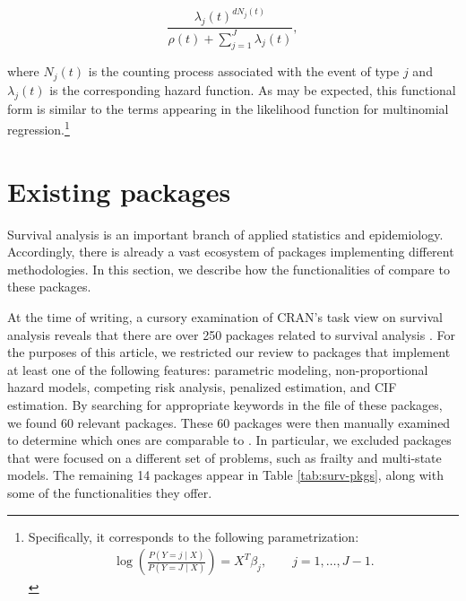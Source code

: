 \documentclass[
]{jss}
\begin{document}
\[\frac{\lambda_j(t)^{dN_j(t)}}{\rho(t) + \sum_{j=1}^J\lambda_j(t)},\]

where \(N_j(t)\) is the counting process associated with the event of
type \(j\) and \(\lambda_j(t)\) is the corresponding hazard function. As
may be expected, this functional form is similar to the terms appearing
in the likelihood function for multinomial
regression.\footnote{Specifically, it corresponds to the following parametrization: \begin{align*} \log\left(\frac{P(Y=j \mid X)}{P(Y = J \mid X)}\right) = X^T\beta_j, \qquad j = 1,\ldots, J-1.\end{align*}}

\hypertarget{existing-packages}{%
\section{Existing packages}\label{existing-packages}}

Survival analysis is an important branch of applied statistics and
epidemiology. Accordingly, there is already a vast ecosystem of 
packages implementing different methodologies. In this section, we
describe how the functionalities of  compare to these
packages.

At the time of writing, a cursory examination of CRAN's task view on
survival analysis reveals that there are over 250 packages related to
survival analysis \citeyearpar{survTaskView}. For the purposes of this
article, we restricted our review to packages that implement at least
one of the following features: parametric modeling, non-proportional
hazard models, competing risk analysis, penalized estimation, and CIF
estimation. By searching for appropriate keywords in the
 file of these packages, we found 60 relevant
packages. These 60 packages were then manually examined to determine
which ones are comparable to . In particular, we excluded
packages that were focused on a different set of problems, such as
frailty and multi-state models. The remaining 14 packages appear in
Table \ref{tab:surv-pkgs}, along with some of the functionalities they
offer.
\end{document}
